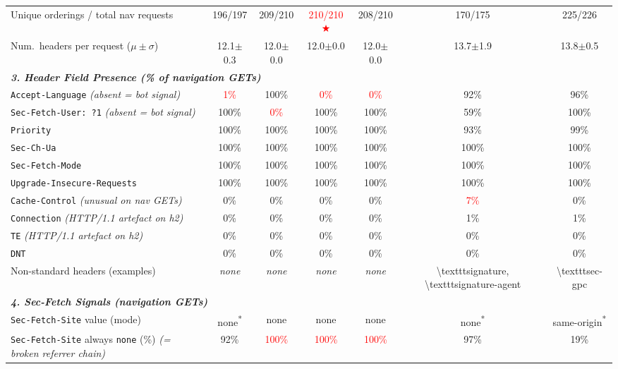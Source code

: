 \begin{table}[htbp]
{\begin{tabular}{lcccccc}
      Unique orderings / total nav requests & 196/197 & 209/210 & \textcolor{red}{210/210 $\bigstar$} & 208/210 & 170/175 & 225/226 \\
      Num.\ headers per request ($\mu \pm \sigma$) & 12.1$\pm$0.3 & 12.0$\pm$0.0 & 12.0$\pm$0.0 & 12.0$\pm$0.0 & 13.7$\pm$1.9 & 13.8$\pm$0.5 \\
      \midrule
      \multicolumn{7}{l}{\small\textit{\textbf{3. Header Field Presence  (\% of navigation GETs)}}} \\
      \midrule[0.3pt]
      \texttt{Accept-Language}  \textit{(absent = bot signal)} & \textcolor{red}{1\%} & 100\% & \textcolor{red}{0\%} & \textcolor{red}{0\%} & 92\% & 96\% \\
      \texttt{Sec-Fetch-User: ?1}  \textit{(absent = bot signal)} & 100\% & \textcolor{red}{0\%} & 100\% & 100\% & 59\% & 100\% \\
      \texttt{Priority} & 100\% & 100\% & 100\% & 100\% & 93\% & 99\% \\
      \texttt{Sec-Ch-Ua} & 100\% & 100\% & 100\% & 100\% & 100\% & 100\% \\
      \texttt{Sec-Fetch-Mode} & 100\% & 100\% & 100\% & 100\% & 100\% & 100\% \\
      \texttt{Upgrade-Insecure-Requests} & 100\% & 100\% & 100\% & 100\% & 100\% & 100\% \\
      \texttt{Cache-Control}  \textit{(unusual on nav GETs)} & 0\% & 0\% & 0\% & 0\% & \textcolor{red}{7\%} & 0\% \\
      \texttt{Connection}  \textit{(HTTP/1.1 artefact on h2)} & 0\% & 0\% & 0\% & 0\% & 1\% & 1\% \\
      \texttt{TE}  \textit{(HTTP/1.1 artefact on h2)} & 0\% & 0\% & 0\% & 0\% & 0\% & 0\% \\
      \texttt{DNT} & 0\% & 0\% & 0\% & 0\% & 0\% & 0\% \\
      Non-standard headers (examples) & \textit{none} & \textit{none} & \textit{none} & \textit{none} & \textbackslash{}texttt{signature}, \textbackslash{}texttt{signature-agent} & \textbackslash{}texttt{sec-gpc} \\
      \midrule
      \multicolumn{7}{l}{\small\textit{\textbf{4. Sec-Fetch Signals  (navigation GETs)}}} \\
      \midrule[0.3pt]
      \texttt{Sec-Fetch-Site} value (mode) & none\textsuperscript{*} & none & none & none & none\textsuperscript{*} & same-origin\textsuperscript{*} \\
      \texttt{Sec-Fetch-Site} always \texttt{none} (\%)  \textit{(= broken referrer chain)} & 92\% & \textcolor{red}{100\%} & \textcolor{red}{100\%} & \textcolor{red}{100\%} & 97\% & 19\% \\

\end{tabular}}
\end{table}

